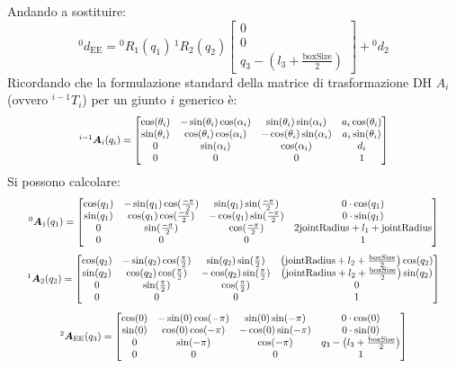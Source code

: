 \documentclass[11pt, a4paper]{report}
\begin{document}
Andando a sostituire:
\[
{}^{0}d_{\text{EE}} = {}^{0}R_{1}(q_1) \, {}^{1}R_{2}(q_2) \begin{bmatrix} 0 \\ 0 \\ q_3 - \left(l_3 + \frac{\text{boxSize}}{2}\right) \end{bmatrix} + {}^{0}d_{2}
\]
Ricordando che la formulazione standard della matrice di trasformazione DH $A_i$ (ovvero ${}^{i-1}T_{i}$) per un giunto $i$ generico è:
\[
\scalebox{0.8}{$
^{i - 1}\bm{A}_{i}(q_{i}) =
    \begin{bmatrix}
        \cos(\theta_i) & -\sin(\theta_i)\cos(\alpha_{i}) & \sin(\theta_i)\sin(\alpha_{i}) & a_{i}\cos(\theta_{i})\\
        \sin(\theta_i) & \cos(\theta_i)\cos(\alpha_{i}) & -\cos(\theta_i)\sin(\alpha_{i}) & a_{i}\sin(\theta_{i})\\
        0 & \sin(\alpha_{i}) & \cos(\alpha_{i}) & d_{i}\\
        0 & 0 & 0 & 1
    \end{bmatrix}
$}
\]
Si possono calcolare:
\[
\scalebox{0.8}{$
^{0}\bm{A}_{1}(q_{1}) =
    \begin{bmatrix}
        \cos(q_1) & -\sin(q_1)\cos(\frac{-\pi}{2}) & \sin(q_1)\sin(\frac{-\pi}{2}) & 0\cdot\cos(q_{1})\\
        \sin(q_1) & \cos(q_1)\cos(\frac{-\pi}{2}) & -\cos(q_1)\sin(\frac{-\pi}{2}) & 0\cdot\sin(q_{1})\\
        0 & \sin(\frac{-\pi}{2}) & \cos(\frac{-\pi}{2}) & 2\text{jointRadius} + l_{1} + \text{jointRadius}\\
        0 & 0 & 0 & 1
    \end{bmatrix}
$}
\]
\[
\scalebox{0.8}{$
^{1}\bm{A}_{2}(q_{2}) =
    \begin{bmatrix}
        \cos(q_2) & -\sin(q_2)\cos(\frac{\pi}{2}) & \sin(q_2)\sin(\frac{\pi}{2}) & \left(\text{jointRadius} + l_{2} + \frac{\text{boxSize}}{2}\right)\cos(q_{2})\\
        \sin(q_2) & \cos(q_2)\cos(\frac{\pi}{2}) & -\cos(q_2)\sin(\frac{\pi}{2}) & \left(\text{jointRadius} + l_{2} + \frac{\text{boxSize}}{2}\right)\sin(q_{2})\\
        0 & \sin(\frac{\pi}{2}) & \cos(\frac{\pi}{2}) & 0\\
        0 & 0 & 0 & 1
    \end{bmatrix}
$}
\]
\[
\scalebox{0.8}{$
^{2}\bm{A}_{\text{EE}}(q_{3}) =
    \begin{bmatrix}
        \cos(0) & -\sin(0)\cos(-\pi) & \sin(0)\sin(-\pi) & 0\cdot\cos(0)\\
        \sin(0) & \cos(0)\cos(-\pi) & -\cos(0)\sin(-\pi) & 0\cdot\sin(0)\\
        0 & \sin(-\pi) & \cos(-\pi) & q_{3} - \left(l_{3} + \frac{\text{boxSize}}{2}\right)\\
        0 & 0 & 0 & 1
    \end{bmatrix}
$}
\]
\end{document}
